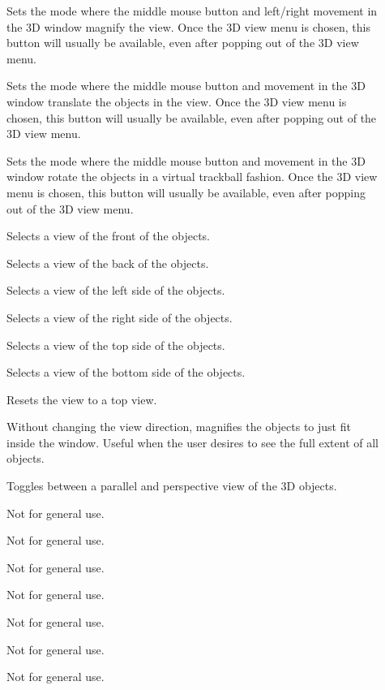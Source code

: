 \begin{description}
\item[]
      Sets the mode where the middle mouse button and left/right movement
      in the 3D window magnify the view.
      Once the 3D view menu is chosen, this button will usually be
      available, even after popping out of the 3D view menu.
\item[]  
      Sets the mode where the middle mouse button and movement
      in the 3D window translate the objects in the view.
      Once the 3D view menu is chosen, this button will usually be
      available, even after popping out of the 3D view menu.
\item[]  Sets the mode where
      the middle mouse button and movement in the 3D window rotate
      the objects in a virtual trackball fashion.
      Once the 3D view menu is chosen, this button will usually be
      available, even after popping out of the 3D view menu.
\item[]  Selects a view of the front of
      the objects.
\item[]  Selects a view of the back of
      the objects.
\item[]  Selects a view of the left side of
      the objects.
\item[]  Selects a view of the right side of
      the objects.
\item[]  Selects a view of the top side of
      the objects.
\item[]  Selects a view of the bottom side of
      the objects.
\item[]  Resets the view to a top view.
\item[]  Without changing the view direction,
      magnifies the objects to just fit inside the window.  Useful when
      the user desires to see the full extent of all objects.
\item[]  Toggles between a
      parallel and perspective view of the 3D objects.
\item[]  Not for general use.
\item[]  Not for general use.
\item[]  Not for general use.
\item[]  Not for general use.
\item[]  Not for general use.
\item[]  Not for general use.
\item[]  Not for general use.
\end{description}

